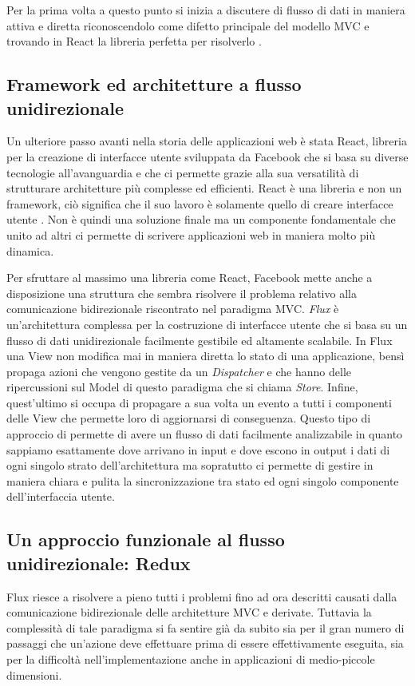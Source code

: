 Per la prima volta a questo punto si inizia a discutere di flusso di dati in maniera attiva e diretta riconoscendolo come difetto principale del modello MVC e trovando in React la libreria perfetta per risolverlo \cite{SalihefendicFluxVsMVC}.

\subsection{Framework ed architetture a flusso unidirezionale}
Un ulteriore passo avanti nella storia delle applicazioni web è stata React, libreria per la creazione di interfacce utente sviluppata da Facebook che si basa su diverse tecnologie all'avanguardia e che ci permette grazie alla sua versatilità di strutturare architetture più complesse ed efficienti.
React è una libreria e non un framework, ciò significa che il suo lavoro è solamente quello di creare interfacce utente \cite{BunaReactIsTheNewFrontend}. Non è quindi una soluzione finale ma un componente fondamentale che unito ad altri ci permette di scrivere applicazioni web in maniera molto più dinamica.

Per sfruttare al massimo una libreria come React, Facebook mette anche a disposizione una struttura che sembra risolvere il problema relativo alla comunicazione bidirezionale riscontrato nel paradigma MVC. \textit{Flux} è un'architettura complessa per la costruzione di interfacce utente che si basa su un flusso di dati unidirezionale facilmente gestibile ed altamente scalabile. In Flux una View non modifica mai in maniera diretta lo stato di una applicazione, bensì propaga azioni che vengono gestite da un \textit{Dispatcher} e che hanno delle ripercussioni sul Model di questo paradigma che si chiama \textit{Store}. Infine, quest'ultimo si occupa di propagare a sua volta un evento a tutti i componenti delle View che permette loro di aggiornarsi di conseguenza. Questo tipo di approccio di permette di avere un flusso di dati facilmente analizzabile in quanto sappiamo esattamente dove arrivano in input e dove escono in output i dati di ogni singolo strato dell'architettura ma sopratutto ci permette di gestire in maniera chiara e pulita la sincronizzazione tra stato ed ogni singolo componente dell'interfaccia utente.

\subsection{Un approccio funzionale al flusso unidirezionale: Redux}
Flux riesce a risolvere a pieno tutti i problemi fino ad ora descritti causati dalla comunicazione bidirezionale delle architetture MVC e derivate. Tuttavia la complessità di tale paradigma si fa sentire già da subito sia per il gran numero di passaggi che un'azione deve effettuare prima di essere effettivamente eseguita, sia per la difficoltà nell'implementazione anche in applicazioni di medio-piccole dimensioni.

